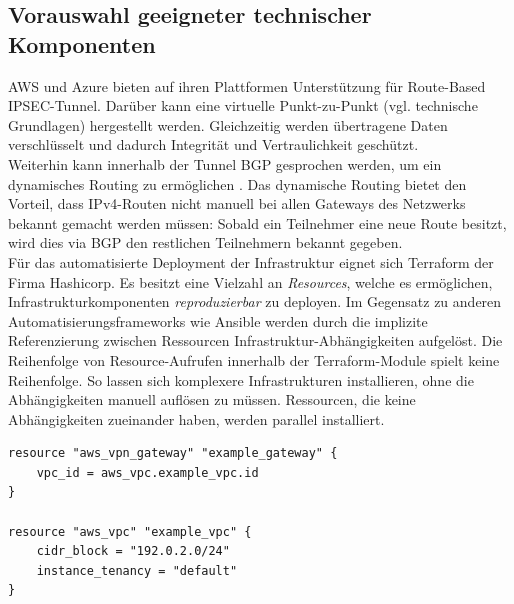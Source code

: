 \subsection{Vorauswahl geeigneter technischer Komponenten}
AWS und Azure bieten auf ihren Plattformen Unterstützung für Route-Based IPSEC-Tunnel. Darüber kann eine virtuelle Punkt-zu-Punkt (vgl. technische Grundlagen) hergestellt werden. Gleichzeitig werden übertragene Daten verschlüsselt und dadurch Integrität und Vertraulichkeit geschützt.\\
Weiterhin kann innerhalb der Tunnel BGP gesprochen werden, um ein dynamisches Routing zu ermöglichen \cite[S. 19]{AlShawi2020} \cite[S. 74-79]{Toroman2019}. Das dynamische Routing bietet den Vorteil, dass IPv4-Routen nicht manuell bei allen Gateways des Netzwerks bekannt gemacht werden müssen: Sobald ein Teilnehmer eine neue Route besitzt, wird dies via BGP den restlichen Teilnehmern bekannt gegeben.\\
Für das automatisierte Deployment der Infrastruktur eignet sich Terraform der Firma Hashicorp. Es besitzt eine Vielzahl an \textit{Resources}, welche es ermöglichen, Infrastrukturkomponenten \textit{reproduzierbar} zu deployen. Im Gegensatz zu anderen Automatisierungsframeworks wie Ansible werden durch die implizite Referenzierung zwischen Ressourcen Infrastruktur-Abhängigkeiten aufgelöst.
Die Reihenfolge von Resource-Aufrufen innerhalb der Terraform-Module spielt keine Reihenfolge. So lassen sich komplexere Infrastrukturen installieren, ohne die Abhängigkeiten manuell auflösen zu müssen. Ressourcen, die keine Abhängigkeiten zueinander haben, werden parallel installiert.

\begin{lstlisting}[label=terraform-implicit-dependeny,caption=Durch die implizite Referenz auf \textit{aws\_vpc.example\_vpc.id} wird zuerst die Ressource \textit{example\_vpc} ausgeführt]
resource "aws_vpn_gateway" "example_gateway" {
	vpc_id = aws_vpc.example_vpc.id
}

resource "aws_vpc" "example_vpc" {
	cidr_block = "192.0.2.0/24"
	instance_tenancy = "default"
}
\end{lstlisting}



